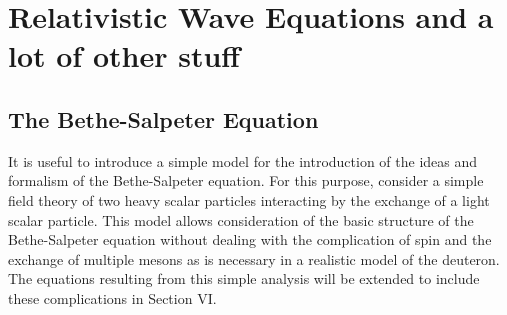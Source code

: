 \documentclass[mythesis.tex]{subfiles}
\begin{document}
\setcounter{chapter}{1}
\chapter{Relativistic Wave Equations and a lot of other stuff}

\section{The Bethe-Salpeter Equation}

It is useful to introduce a simple model for the introduction of the ideas
and formalism of the Bethe-Salpeter equation. For this purpose, consider
a simple field theory of two heavy scalar particles interacting by the
exchange of a light scalar particle. This model allows  consideration of the
basic structure of the Bethe-Salpeter equation without dealing with the
complication of spin and the exchange of multiple mesons as is necessary
in a realistic model of the deuteron. The equations
resulting from this simple analysis will be extended to include these
complications in Section VI.
\end{document}
